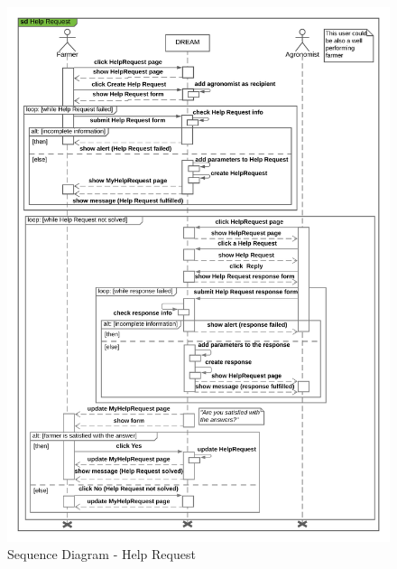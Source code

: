\begin{center}
    \begin{figure}[H]
  \includegraphics[width=\textwidth,height=\textheight,keepaspectratio]{./Images/Sequence Diagram Help Request.png}
       \vspace*{-0.9cm}
  \caption{Sequence Diagram - Help Request}
\end{figure}
\end{center}


